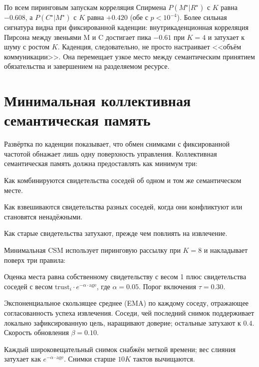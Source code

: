 \documentclass{article}
\begin{document}
По всем пиринговым запускам корреляция Спирмена $P(M^\star|R^\star)$ с
$K$ равна $-0.608$, а $P(C^\star|M^\star)$ с $K$ равна $+0.420$ (обе с
$p<10^{-4}$). Более сильная сигнатура видна при фиксированной каденции:
внутрикаденционная корреляция Пирсона между звеньями M и C достигает
пика $-0.61$ при $K{=}4$ и затухает к шуму с ростом $K$. Каденция,
следовательно, не просто настраивает <<объём коммуникации>>. Она
перемещает узкое место между семантическим принятием обязательства и
завершением на разделяемом ресурсе.

\section{Минимальная коллективная семантическая память}
\label{sec:csm}

Развёртка по каденции показывает, что обмен снимками с фиксированной
частотой обнажает лишь одну поверхность управления. Коллективная
семантическая память должна предоставлять как минимум три:
\begin{description}[leftmargin=14pt,itemsep=1pt,topsep=2pt]
\item[Слияние.] Как комбинируются свидетельства соседей об одном и том же семантическом месте.
\item[Доверие.] Как взвешиваются свидетельства разных соседей, когда они конфликтуют или становятся ненадёжными.
\item[Устаревание.] Как старые свидетельства затухают, прежде чем повлиять на извлечение.
\end{description}

Минимальная CSM использует пиринговую рассылку при $K{=}8$ и
накладывает поверх три правила:
\begin{description}[leftmargin=14pt,itemsep=1pt,topsep=2pt]
\item[\textit{Слияние.}] Оценка места равна собственному свидетельству с весом 1 плюс свидетельства соседей с весом $\mathrm{trust}_i \cdot e^{-\alpha \cdot \mathrm{age}}$, где $\alpha=0.05$. Порог включения $\tau=0.30$.
\item[\textit{Доверие.}] Экспоненциальное скользящее среднее (EMA) по каждому соседу, отражающее согласованность успеха извлечения. Соседи, чей последний снимок поддерживает локально зафиксированную цель, наращивают доверие; остальные затухают к $0.4$. Скорость обновления $\beta=0.10$.
\item[\textit{Устаревание.}] Каждый широковещательный снимок снабжён меткой времени; вес слияния затухает как $e^{-\alpha\cdot\mathrm{age}}$. Снимки старше $10K$ тактов вычищаются.
\end{description}
\end{document}
